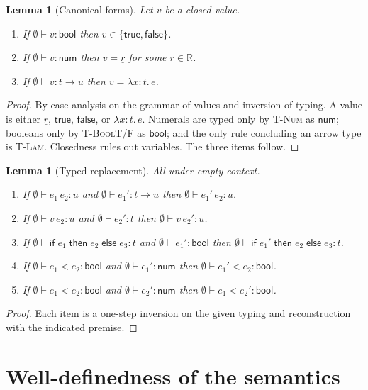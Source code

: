 \documentclass[11pt]{article}
\newtheorem{lemma}[theorem]{Lemma}
\newcommand{\ty}[1]{\mathsf{#1}}
\newcommand{\bool}{\ty{bool}}
\newcommand{\num}{\ty{num}}
\newcommand{\arr}{\rightarrow}
\newcommand{\ul}[1]{\underline{#1}} %
\newcommand{\RR}{\mathbb{R}}
\begin{document}
\begin{lemma}[Canonical forms]\label{lem:canonical}
Let $v$ be a closed value.
\begin{enumerate}
\item If $\emptyset\vdash v:\bool$ then $v\in\{\ty{true},\ty{false}\}$.
\item If $\emptyset\vdash v:\num$ then $v=\ul r$ for some $r\in\RR$.
\item If $\emptyset\vdash v:t\arr u$ then $v=\lambda x{:}t.\,e$.
\end{enumerate}
\end{lemma}
\begin{proof}
By case analysis on the grammar of values and inversion of typing.
A value is either $\ul r$, $\ty{true}$, $\ty{false}$, or $\lambda x{:}t.\,e$.
Numerals are typed only by \textsc{T-Num} as $\num$; booleans only by \textsc{T-BoolT/F} as $\bool$; and the only rule concluding an arrow type is \textsc{T-Lam}.
Closedness rules out variables. The three items follow.
\end{proof}

\begin{lemma}[Typed replacement]\label{lem:frames}
All under empty context.
\begin{enumerate}
\item If $\emptyset\vdash e_1\,e_2:u$ and $\emptyset\vdash e_1':t\arr u$ then $\emptyset\vdash e_1'\,e_2:u$.
\item If $\emptyset\vdash v\,e_2:u$ and $\emptyset\vdash e_2':t$ then $\emptyset\vdash v\,e_2':u$.
\item If $\emptyset\vdash \ty{if}\;e_1\;\ty{then}\;e_2\;\ty{else}\;e_3:t$ and $\emptyset\vdash e_1':\bool$ then $\emptyset\vdash \ty{if}\;e_1'\;\ty{then}\;e_2\;\ty{else}\;e_3:t$.
\item If $\emptyset\vdash e_1{<}e_2:\bool$ and $\emptyset\vdash e_1':\num$ then $\emptyset\vdash e_1'{<}e_2:\bool$.
\item If $\emptyset\vdash e_1{<}e_2:\bool$ and $\emptyset\vdash e_2':\num$ then $\emptyset\vdash e_1{<}e_2':\bool$.
\end{enumerate}
\end{lemma}
\begin{proof}
Each item is a one-step inversion on the given typing and reconstruction with the indicated premise.
\end{proof}

\section*{Well-definedness of the semantics}
\end{document}
